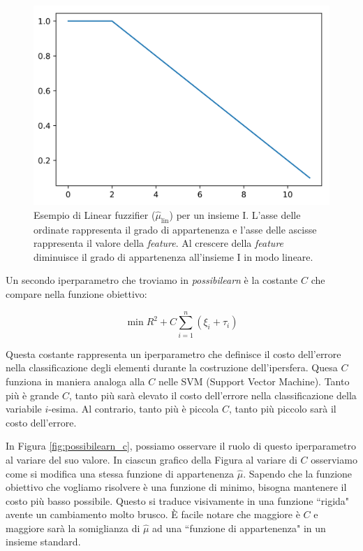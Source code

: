 \documentclass[12pt,italian]{report}
\begin{document}
\begin{figure}[h!]
	\center
	\includegraphics[scale=0.1]{../img/lin}
	\caption{Esempio di Linear fuzzifier ($\hat\mu_{\text{lin}}$) per un insieme I. L'asse delle ordinate rappresenta il grado di appartenenza e l'asse delle ascisse rappresenta il valore della \emph{feature}. Al crescere della \emph{feature} diminuisce il grado di appartenenza all'insieme I in modo lineare.}
	\label{fig:fuzzifier}
\end{figure}

Un secondo iperparametro che troviamo in \emph{possibilearn} è la costante $C$ che compare nella funzione obiettivo:

\[ \min R^2 + C\sum_{i=1}^{n} (\xi_{i} + \tau_{i}) \]

Questa costante rappresenta un iperparametro che definisce il costo dell'errore nella classificazione degli elementi durante la costruzione dell'ipersfera. Quesa $ C$ funziona in maniera analoga alla $C$ nelle SVM (Support Vector Machine). Tanto più è grande $C$, tanto più sarà elevato il costo dell'errore nella classificazione della variabile $i$-esima. Al contrario, tanto più è piccola $C$, tanto più piccolo sarà il costo dell'errore. 

In Figura \ref{fig:possibilearn_c}, possiamo osservare il ruolo di questo iperparametro al variare del suo valore. In ciascun grafico della Figura al variare di $C$ osserviamo come si modifica una stessa funzione di appartenenza $\hat \mu$. 
Sapendo che la funzione obiettivo che vogliamo risolvere è una funzione di minimo, bisogna mantenere il costo più basso possibile. Questo si traduce visivamente in una funzione ``rigida" avente un cambiamento molto brusco. È facile notare che maggiore è $C$ e maggiore sarà la somiglianza di $\hat \mu$ ad una ``funzione di appartenenza" in un insieme standard.
\end{document}
